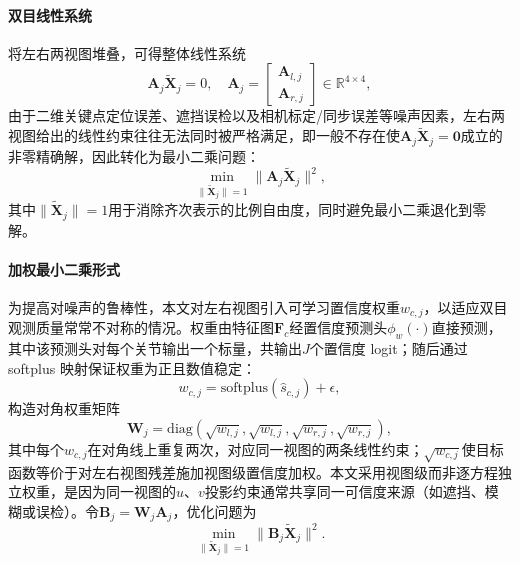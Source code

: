 \paragraph{双目线性系统}
将左右两视图堆叠，可得整体线性系统
\begin{equation}
\mathbf{A}_j\tilde{\mathbf{X}}_j=0,\quad
\mathbf{A}_j=
\begin{bmatrix}
\mathbf{A}_{l,j}\\
\mathbf{A}_{r,j}
\end{bmatrix}
\in\mathbb{R}^{4\times4},
\label{eq:pdrm_Aj}
\end{equation}
由于二维关键点定位误差、遮挡误检以及相机标定/同步误差等噪声因素，左右两视图给出的线性约束往往无法同时被严格满足，即一般不存在使$\mathbf{A}_j\tilde{\mathbf{X}}_j=\mathbf{0}$成立的非零精确解，因此转化为最小二乘问题：
\begin{equation}
\min_{\|\tilde{\mathbf{X}}_j\|=1}\|\mathbf{A}_j\tilde{\mathbf{X}}_j\|^2,
\label{eq:pdrm_ls}
\end{equation}
其中$\|\tilde{\mathbf{X}}_j\|=1$用于消除齐次表示的比例自由度，同时避免最小二乘退化到零解。

\paragraph{加权最小二乘形式}
为提高对噪声的鲁棒性，本文对左右视图引入可学习置信度权重$w_{c,j}$，以适应双目观测质量常常不对称的情况。权重由特征图$\mathbf{F}_c$经置信度预测头$\phi_w(\cdot)$直接预测，其中该预测头对每个关节输出一个标量，共输出$J$个置信度 logit；随后通过 softplus 映射保证权重为正且数值稳定：
\begin{equation}
w_{c,j}=\mathrm{softplus}(\hat{s}_{c,j})+\epsilon,
\label{eq:pdrm_w_def}
\end{equation}
构造对角权重矩阵
\begin{equation}
\mathbf{W}_j=
\mathrm{diag}(\sqrt{w_{l,j}},\sqrt{w_{l,j}},\sqrt{w_{r,j}},\sqrt{w_{r,j}}),
\label{eq:pdrm_Wj}
\end{equation}
其中每个$w_{c,j}$在对角线上重复两次，对应同一视图的两条线性约束；$\sqrt{w_{c,j}}$使目标函数等价于对左右视图残差施加视图级置信度加权。本文采用视图级而非逐方程独立权重，是因为同一视图的$u$、$v$投影约束通常共享同一可信度来源（如遮挡、模糊或误检）。令$\mathbf{B}_j=\mathbf{W}_j\mathbf{A}_j$，优化问题为
\begin{equation}
\min_{\|\tilde{\mathbf{X}}_j\|=1}\|\mathbf{B}_j\tilde{\mathbf{X}}_j\|^2.
\label{eq:pdrm_wls}
\end{equation}

